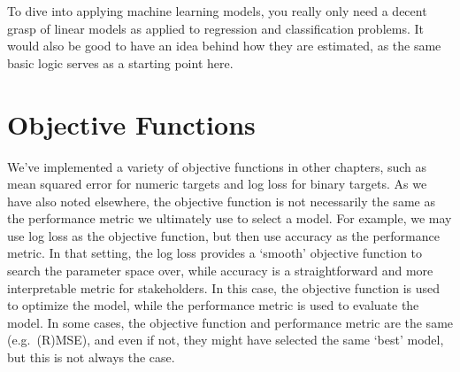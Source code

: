 \documentclass[
  letterpaper,
]{krantz}
\begin{document}
To dive into applying machine learning models, you really only need a
decent grasp of linear models as applied to regression and
classification problems. It would also be good to have an idea behind
how they are estimated, as the same basic logic serves as a starting
point here.

\section{Objective Functions}\label{sec-ml-objective}

We've implemented a variety of objective functions in other chapters,
such as mean squared error for numeric targets and log loss for binary
targets. As we have also noted elsewhere, the objective function is not
necessarily the same as the performance metric we ultimately use to
select a model. For example, we may use log loss as the objective
function, but then use accuracy as the performance metric. In that
setting, the log loss provides a `smooth' objective function to search
the parameter space over, while accuracy is a straightforward and more
interpretable metric for stakeholders. In this case, the objective
function is used to optimize the model, while the performance metric is
used to evaluate the model. In some cases, the objective function and
performance metric are the same (e.g.~(R)MSE), and even if not, they
might have selected the same `best' model, but this is not always the
case.
\end{document}
